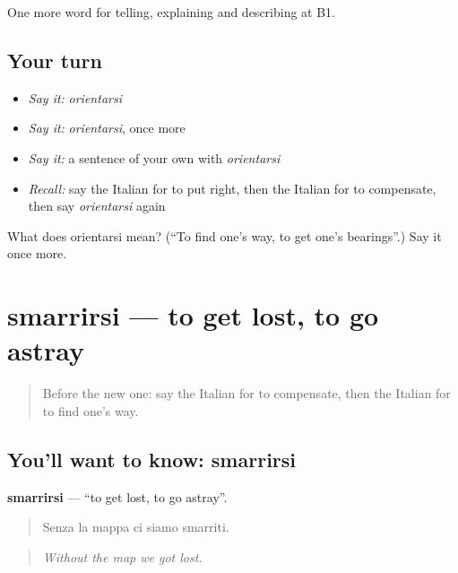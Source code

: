 \begin{grammarlens}[title={What you've built}]
One more word for telling, explaining and describing at B1.
\end{grammarlens}

\subsection*{Your turn}
\begin{itemize}
\raggedright
  \item \emph{Say it:} \emph{orientarsi}
  \item \emph{Say it:} \emph{orientarsi}, once more
  \item \emph{Say it:} a sentence of your own with \emph{orientarsi}
  \item \emph{Recall:} say the Italian for to put right, then the Italian for to compensate, then say \emph{orientarsi} again
\end{itemize}

\begin{tcolorbox}[breakable,colback=teal!4,colframe=teal!35!black,title={Before you move on}]
What does orientarsi mean? (\textquotedblleft{}To find one's way, to get one's bearings\textquotedblright{}.) Say it once more.
\end{tcolorbox}
\section[smarrirsi]{smarrirsi — to get lost, to go astray}

\label{lesson:IT-C439-smarrirsi}



\begin{quote}
Before the new one: say the Italian for to compensate, then the Italian for to find one's way.
\end{quote}

\subsection*{You'll want to know: smarrirsi}
\textbf{smarrirsi} — \textquotedblleft{}to get lost, to go astray\textquotedblright{}.

\begin{quote}
Senza la mappa ci siamo smarriti.
\end{quote}

\begin{quote}
\emph{Without the map we got lost.}
\end{quote}

